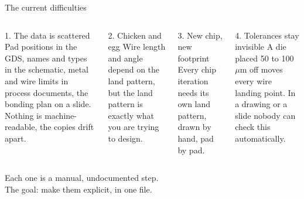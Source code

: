 \documentclass[aspectratio=169,11pt]{beamer}
\begin{document}
\begin{frame}{The current difficulties}
  \small
  \begin{columns}[T]
      \begin{alertblock}{1. The data is scattered}
        Pad positions in the GDS, names and types in the schematic, metal and wire limits in process documents, the bonding plan on a slide. Nothing is machine-readable, the copies drift apart.
      \end{alertblock}
      \begin{alertblock}{2. Chicken and egg}
        Wire length and angle depend on the land pattern, but the land pattern is exactly what you are trying to design.
      \end{alertblock}
      \begin{alertblock}{3. New chip, new footprint}
        Every chip iteration needs its own land pattern, drawn by hand, pad by pad.
      \end{alertblock}
      \begin{alertblock}{4. Tolerances stay invisible}
        A die placed 50 to 100 $\mu$m off moves every wire landing point. In a drawing or a slide nobody can check this automatically.
      \end{alertblock}
  \end{columns}
  \vfill
  \begin{center}
    Each one is a manual, undocumented step.\\
    \color{cobgrey}\footnotesize The goal: make them explicit, in one file.
  \end{center}
\end{frame}
\end{document}
